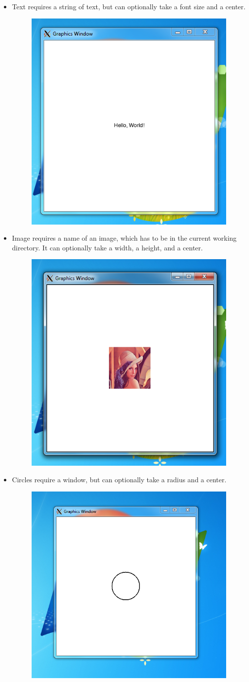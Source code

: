 \documentclass{article}
\begin{document}
\pagebreak
\begin{itemize}
\item Text requires a string of text, but can optionally take a font size and a center. 
\begin{figure}[h!]
\centering
\includegraphics[width=.5\textwidth]{text}
\end{figure}

\item Image requires a name of an image, which has to be in the current working directory. It can optionally take a width, a height, and a center. 
\begin{figure}[h!]
\centering
\includegraphics[width=.5\textwidth]{image}
\end{figure}

\pagebreak
\item Circles require a window, but can optionally take a radius and a center. 
\begin{figure}[h!]
\centering
\includegraphics[width=.5\textwidth]{circle}
\end{figure}


\end{itemize}
\end{document}
